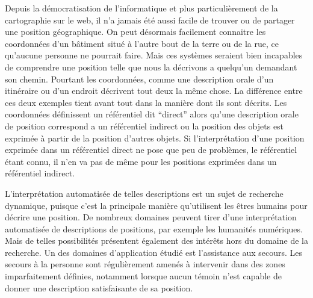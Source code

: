 
Depuis la démocratisation de l'informatique et plus particulièrement
de la cartographie sur le web, il n'a jamais été aussi facile de
trouver ou de partager une position géographique. On peut désormais
facilement connaitre les coordonnées d'un bâtiment situé à l'autre
bout de la terre ou de la rue, ce qu'aucune personne ne pourrait
faire. Mais ces systèmes seraient bien incapables de comprendre une
position telle que nous la décrivons a quelqu’un demandant son
chemin. Pourtant les coordonnées, comme une description orale d'un
itinéraire ou d'un endroit décrivent tout deux la même chose. La
différence entre ces deux exemples tient avant tout dans la manière
dont ils sont décrits. Les coordonnées définissent un référentiel dit
\enquote{direct} alors qu'une description orale de position correspond
a un référentiel indirect ou la position des objets est exprimée à
partir de la position d'autres objets. Si l’interprétation d'une
position exprimée dans un référentiel direct ne pose que peu de
problèmes, le référentiel étant connu, il n'en va pas de même pour les
positions exprimées dans un référentiel indirect.

L'interprétation automatisée de telles descriptions est un sujet de
recherche dynamique, puisque c'est la principale manière qu'utilisent
les êtres humains pour décrire une position. De nombreux domaines
peuvent tirer d'une interprétation automatisée de descriptions de
positions, par exemple les humanités numériques. Mais de telles
possibilités présentent également des intérêts hors du domaine de la
recherche. Un des domaines d’application étudié est l'assistance aux
secours. Les secours à la personne sont régulièrement amenés à
intervenir dans des zones imparfaitement définies, notamment lorsque
aucun témoin  n'est capable de donner une description satisfaisante de
sa position.









